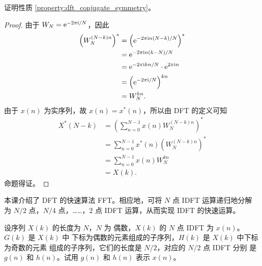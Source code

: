 \begin{homework}
    证明性质 \ref{property:dft_conjugate_symmetry}。
\end{homework}

\begin{proof}
    由于 $W_N = \mathrm{e}^{-2\pi\mathrm{i}/N}$，因此
    \begin{align*}
        \left(W_N^{(N - k)n}\right)^* & = \left(\mathrm{e}^{-2\pi\mathrm{i} n(N-k)/N}\right)^* \\
        & = \mathrm{e}^{-2\pi\mathrm{i} n(k-N)/N} \\
        & = \mathrm{e}^{-2\pi\mathrm{i} kn/N} \cdot \mathrm{e}^{2\pi\mathrm{i} n} \\
        & = \left(\mathrm{e}^{-2\pi\mathrm{i}/N}\right)^{kn} \\
        & = W_N^{kn}.
    \end{align*}
    由于 $x(n)$ 为实序列，故 $x(n) = x^*(n)$，所以由 DFT 的定义可知
    \begin{align*}
        X^*(N - k) & = \left(\sum_{n = 0}^{N - 1} x(n)W_N^{(N - k)n}\right)^* \\
        & = \sum_{n = 0}^{N - 1} x^*(n)\left(W_N^{(N - k)n}\right)^* \\
        & = \sum_{n = 0}^{N - 1} x(n)W_N^{kn} \\
        & = X(k).
    \end{align*}
    命题得证。
\end{proof}

\begin{homework}
    本课介绍了 DFT 的快速算法 FFT。相应地，可将 $N$ 点 IDFT 运算递归地分解
    为 $N/2$ 点，$N/4$ 点，……，$2$ 点 IDFT 运算，从而实现 IDFT 的快速运算。

    设序列 $X(k)$ 的长度为 $N$，$N$ 为
    偶数，$X(k)$ 的 $N$ 点 IDFT 为 $x(n)$。$G(k)$ 是 $X(k)$ 中
    下标为偶数的元素组成的子序列，$H(k)$ 是 $X(k)$ 中下标为奇数的元素
    组成的子序列，它们的长度是 $N/2$，对应的 $N/2$ 点 IDFT 分别
    是 $g(n)$ 和 $h(n)$。试用 $g(n)$ 和 $h(n)$ 表示 $x(n)$。
\end{homework}

